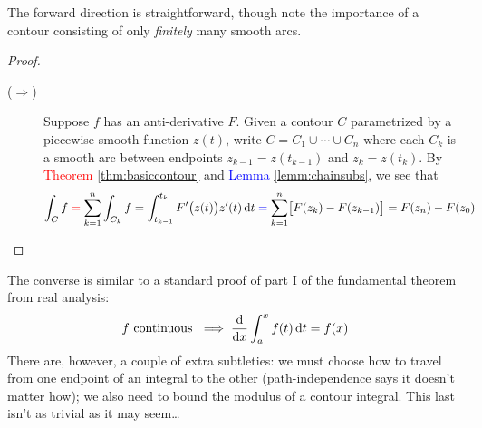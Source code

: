 \goodbreak



The forward direction is straightforward, though note the importance of a contour consisting of only \emph{finitely} many smooth arcs.


\begin{proof}
	\begin{description}
		\item[\normalfont ($\Rightarrow$)] Suppose $f$ has an anti-derivative $F$. Given a contour $C$ parametrized by a piecewise smooth function $z(t)$, write $C=C_1\cup\cdots\cup C_n$ where each $C_k$ is a smooth arc between endpoints $z_{k-1}=z(t_{k-1})$ and $z_k=z(t_k)$. By \textcolor{red}{Theorem \ref{thm:basiccontour}} and \textcolor{blue}{Lemma \ref{lemm:chainsubs}}, we see that
		\[
			\int_Cf \mathrel{\textcolor{red}{=}} \sum_{k=1}^n\int_{C_k}f
			=\int_{t_{k-1}}^{t_k}F'\bigl(z(t)\bigr)z'(t)\,\dt
			\mathrel{\textcolor{blue}{=}} \sum_{k=1}^n\bigl[F(z_k)-F(z_{k-1})\bigr] 
			=F(z_n)-F(z_0) \tag*{\phantom{\qedhere}}
		\]
	\end{description}
\end{proof}

The converse is similar to a standard proof of part I of the fundamental theorem from real analysis:
\[
	f\text{ continuous }\implies\frac{\mathrm{d} }{\mathrm{d} x}\int_a^xf(t)\,{\mathrm{d} t}=f(x)
\]
There are, however, a couple of extra subtleties: we must choose how to travel from one endpoint of an integral to the other (path-independence says it doesn't matter how); we also need to bound the modulus of a contour integral. This last isn't as trivial as it may seem\ldots
 
